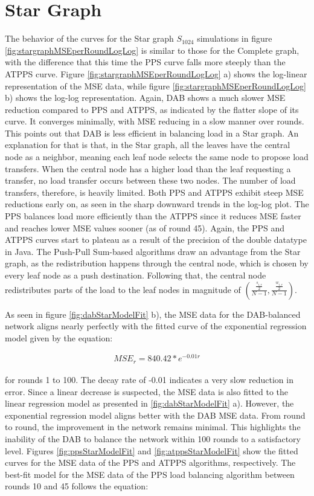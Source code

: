 \section{Star Graph}\label{sec:stargraph}
The behavior of the curves for the Star graph $S_{1024}$ simulations in figure \ref{fig:stargraphMSEperRoundLogLog} is similar to those for the Complete graph, with the difference that this time the PPS curve falls more steeply than the ATPPS curve. Figure \ref{fig:stargraphMSEperRoundLogLog} a) shows the log-linear representation of the MSE data, while figure \ref{fig:stargraphMSEperRoundLogLog} b) shows the log-log representation. Again, DAB shows a much slower MSE reduction compared to PPS and ATPPS, as indicated by the flatter slope of its curve. It converges minimally, with MSE reducing in a slow manner over rounds. This points out that DAB is less efficient in balancing load in a Star graph. An explanation for that is that, in the Star graph, all the leaves have the central node as a neighbor, meaning each leaf node selects the same node to propose load transfers. When the central node has a higher load than the leaf requesting a transfer, no load transfer occurs between these two nodes. The number of load transfers, therefore, is heavily limited. Both PPS and ATPPS exhibit steep MSE reductions early on, as seen in the sharp downward trends in the log-log plot. The PPS balances load more efficiently than the ATPPS since it reduces MSE faster and reaches lower MSE values sooner (as of round 45). Again, the PPS and ATPPS curves start to plateau as a result of the precision of the double datatype in Java. The Push-Pull Sum-based algorithms draw an advantage from the Star graph, as the redistribution happens through the central node, which is chosen by every leaf node as a push destination. Following that, the central node redistributes parts of the load to the leaf nodes in magnitude of $\left(\frac{\frac{s_{i,r}}{2}}{N-1}, \frac{\frac{w_{i,r}}{2}}{N-1}\right)$.

As seen in figure \ref{fig:dabStarModelFit} b), the MSE data for the DAB-balanced network aligns nearly perfectly with the fitted curve of the exponential regression model given by the equation:

\begin{align}
    MSE_r=840.42*e^{-0.01r}    
\end{align}

for rounds 1 to 100. The decay rate of -0.01 indicates a very slow reduction in error. Since a linear decrease is suspected, the MSE data is also fitted to the linear regression model as presented in \ref{fig:dabStarModelFit} a). However, the exponential regression model aligns better with the DAB MSE data. From round to round, the improvement in the network remains minimal. This highlights the inability of the DAB to balance the network within 100 rounds to a satisfactory level. Figures \ref{fig:ppsStarModelFit} and \ref{fig:atppsStarModelFit} show the fitted curves for the MSE data of the PPS and ATPPS algorithms, respectively. The best-fit model for the MSE data of the PPS load balancing algorithm between rounds 10 and 45 follows the equation:

